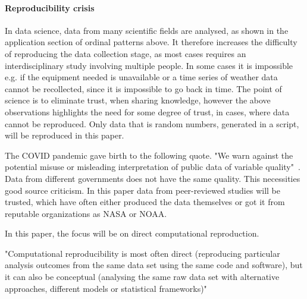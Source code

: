 \paragraph{Reproducibility crisis}
In data science, data from many scientific fields are analysed, as shown in the application section of ordinal patterns above. It therefore increases the difficulty of reproducing the data collection stage, as most cases requires an interdisciplinary study involving multiple people. In some cases it is impossible e.g. if the equipment needed is unavailable or a time series of weather data cannot be recollected, since it is impossible to go back in time. The point of science is to eliminate trust, when sharing knowledge, however the above observations highlights the need for some degree of trust, in cases, where data cannot be reproduced. Only data that is random numbers, generated in a script, will be reproduced in this paper.

The COVID pandemic gave birth to the following quote. "We warn against the potential misuse or misleading interpretation of public data of variable quality"~\cite{Struelens2021}. Data from different governments does not have the same quality. This necessities good source criticism. In this paper data from peer-reviewed studies will be trusted, which have often either produced the data themselves or got it from reputable organizations as NASA or NOAA. 

In this paper, the focus will be on direct computational reproduction.

"Computational reproducibility is most often direct (reproducing particular analysis outcomes from the same data set using the same code and software), but it can also be conceptual (analysing the same raw data set with alternative approaches, different models or statistical frameworks)"~\cite{Fidler2018}

